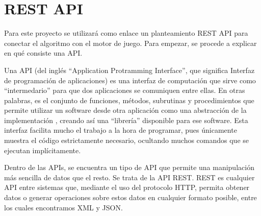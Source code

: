 \section{REST API}

Para este proyecto se utilizará como enlace un planteamiento REST API para conectar el algoritmo con el motor de juego.  Para empezar, se procede a explicar en qué consiste una API.

Una API (del inglés “Application Protramming Interface”, que significa Interfaz de programación de aplicaciones) es una interfaz de computación  que sirve como “intermedario” para  que dos aplicaciones  se comuniquen entre ellas.   
En otras palabras, es el conjunto de funciones, métodos, subrutinas y procedimientos que permite utilizar un software desde otra aplicación como una abstracción de la implementación ,  creando así una “librería” disponible para ese software.
Esta interfaz facilita mucho el trabajo a la hora de programar, pues únicamente muestra el código estrictamente necesario, ocultando muchos comandos que se ejecutan implícitamente. \cite{api1}

Dentro de las APIs,  se encuentra un  tipo de API  que permite una manipulación más sencilla de datos que el resto. Se trata de la API REST.
REST es cualquier API entre sistemas que, mediante el uso del protocolo HTTP, permita obtener datos o generar operaciones sobre estos datos en cualquier formato posible, entre los cuales encontramos XML y JSON. 


